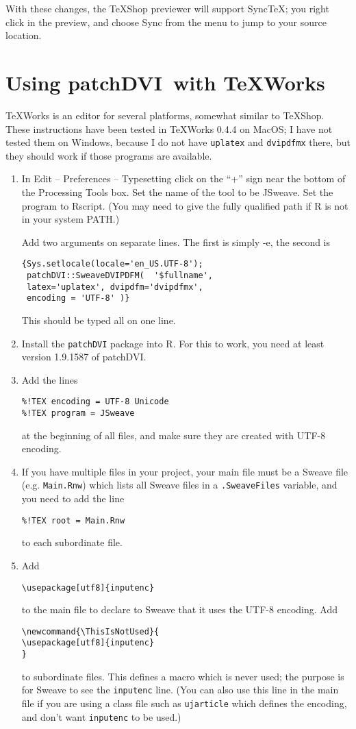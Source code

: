 \documentclass[12pt]{ujarticle}
\newcommand{\ThisIsNotUsed}{
\usepackage[utf8]{inputenc}
}
\newcommand{\patchDVI}{\patchDVIn\ }
\newcommand{\patchDVIn}{\textbf{patchDVI}}
\begin{document}
With these changes, the TeXShop previewer will support SyncTeX; you right click in the preview, and choose Sync from the menu
to jump to your source location.

\section{Using \patchDVI with TeXWorks}
\label{sec:texworks}

TeXWorks is an editor for several platforms, somewhat similar to TeXShop.  These instructions 
have been tested in TeXWorks 0.4.4 on MacOS; I have not tested them on Windows, because
I do not have \texttt{uplatex} and \texttt{dvipdfmx} there, but they should work if those
programs are available.

\begin{enumerate}
\item 
In 
Edit -- Preferences -- Typesetting 
click on the ``+'' sign near the bottom of the Processing Tools box.  Set the name of the tool to be JSweave.
Set the program to Rscript.  (You may need to give the fully qualified path
if R is not in your system PATH.)

Add two arguments on separate lines.  The first is simply -e, the second is
\begin{verbatim}
{Sys.setlocale(locale='en_US.UTF-8');
 patchDVI::SweaveDVIPDFM(  '$fullname',
 latex='uplatex', dvipdfm='dvipdfmx', 
 encoding = 'UTF-8' )}
\end{verbatim}
This should be typed all on one line.

\item Install the \texttt{patchDVI} package into R.  For this to work,  you need
at least version 1.9.1587 of patchDVI.
\item Add the lines 
\begin{verbatim}
%!TEX encoding = UTF-8 Unicode
%!TEX program = JSweave
\end{verbatim}
at the beginning of all files, and make sure they are created with UTF-8 encoding.
\item If you have multiple files in your project, your main file must be a Sweave file
(e.g. \texttt{Main.Rnw}) which lists all Sweave files in a \texttt{.SweaveFiles} variable, 
and you need to add the line
\begin{verbatim}
%!TEX root = Main.Rnw
\end{verbatim}
to each subordinate file.
\item Add
\begin{verbatim}
\usepackage[utf8]{inputenc}
\end{verbatim}
to the main file to declare to Sweave that it uses the UTF-8 encoding.  Add
\begin{verbatim}
\newcommand{\ThisIsNotUsed}{
\usepackage[utf8]{inputenc}
}
\end{verbatim}
to subordinate files.  This defines a macro which is never used; the purpose is
for Sweave to see the \texttt{inputenc} line.  (You can also use this line in the main file
if you are using a class file such as \texttt{ujarticle} which defines the encoding, 
and don't want \texttt{inputenc} to be used.)


\end{enumerate}
\end{document}
